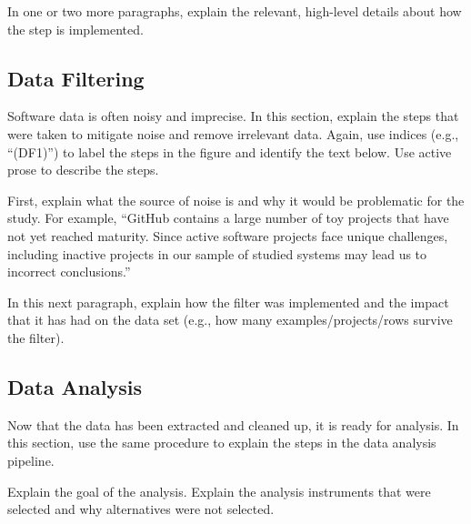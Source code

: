 In one or two more paragraphs, explain the relevant, high-level details about how the step is implemented.

\subsection{Data Filtering}

Software data is often noisy and imprecise.
In this section, explain the steps that were taken to mitigate noise and remove irrelevant data.
Again, use indices (e.g., ``(DF1)'') to label the steps in the figure and identify the text below.
Use active prose to describe the steps.

First, explain what the source of noise is and why it would be problematic for the study.
For example, ``GitHub contains a large number of toy projects that have not yet reached maturity. Since active software projects face unique challenges, including inactive projects in our sample of studied systems may lead us to incorrect conclusions.''

In this next paragraph, explain how the filter was implemented and the impact that it has had on the data set (e.g., how many examples/projects/rows survive the filter).

\subsection{Data Analysis}

Now that the data has been extracted and cleaned up, it is ready for analysis.
In this section, use the same procedure to explain the steps in the data analysis pipeline.

Explain the goal of the analysis.
Explain the analysis instruments that were selected and why alternatives were not selected.